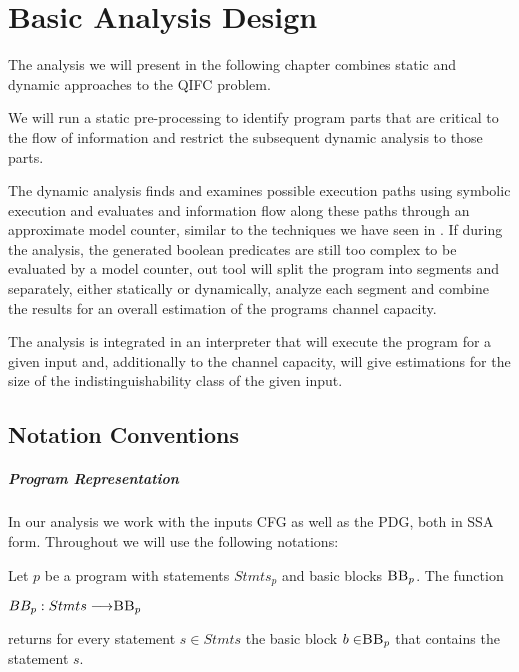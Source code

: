 \chapter{Basic Analysis Design}\label{sec:impl}

The analysis we will present in the following chapter combines static and dynamic approaches to the QIFC problem. 

We will run a static pre-processing to identify program parts that are critical to the flow of information and restrict the subsequent dynamic analysis to those parts.

The dynamic analysis finds and examines possible execution paths using symbolic execution and evaluates and information flow along these paths through an approximate model counter, similar to the techniques we have seen in \cite{klebanov13, biondi18, chu19}.
If during the analysis, the generated boolean predicates are still too complex to be evaluated by a model counter, out tool will split the program into segments and separately, either statically or dynamically, analyze each segment and combine the results for an overall estimation of the programs channel capacity.

The analysis is integrated in an interpreter that will execute the program for a given input and, additionally to the channel capacity, will give estimations for the size of the indistinguishability class of the given input.


\section{Notation Conventions}

\paragraph{Program Representation}
In our analysis we work with the inputs CFG as well as the PDG, both in SSA form. Throughout we will use the following notations:

\begin{definition}
    Let $p$ be a program with statements $Stmts_p$ and basic blocks $\mbb_p$. The function
    \begin{center}
        $BB_p: Stmts \longrightarrow \mbb_p$
    \end{center}
    returns for every statement $s \in Stmts$ the basic block $b \in \mbb_p$ that contains the statement $s$.
\end{definition}

